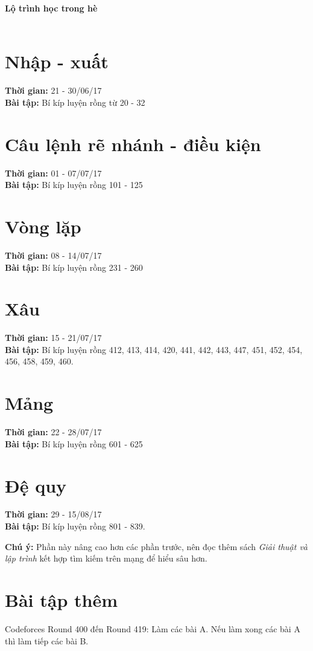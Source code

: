 \documentclass[oneside,12pt]{book}
\begin{document}
\frontmatter



\tableofcontents
\clearpage
\ifodd\value{page}\else
\thispagestyle{empty}
\fi
%
\mainmatter
%

{\noindent\LARGE\normalfont\bfseries Lộ trình học trong hè\\ \\ }




\section{Nhập - xuất}
\textbf{Thời gian: }21 - 30/06/17\\
\textbf{Bài tập: }Bí kíp luyện rồng từ 20 - 32

\section{Câu lệnh rẽ nhánh - điều kiện}
\textbf{Thời gian: } 01 - 07/07/17\\
\textbf{Bài tập: } Bí kíp luyện rồng 101 - 125

\section{Vòng lặp}
\textbf{Thời gian: } 08 - 14/07/17\\
\textbf{Bài tập: } Bí kíp luyện rồng 231 - 260

\section{Xâu}
\textbf{Thời gian: } 15 - 21/07/17\\
\textbf{Bài tập: } Bí kíp luyện rồng 412, 413, 414, 420, 441, 442, 443, 447, 451, 452, 454, 456, 458, 459, 460.

\section{Mảng}
\textbf{Thời gian: } 22 - 28/07/17\\
\textbf{Bài tập: } Bí kíp luyện rồng 601 - 625

\section{Đệ quy}
\textbf{Thời gian: } 29 - 15/08/17\\
\textbf{Bài tập: } Bí kíp luyện rồng 801 - 839.

\textbf{Chú ý: } Phần này nâng cao hơn các phần trước, nên đọc thêm sách \textit{Giải thuật và lập trình} kết hợp tìm kiếm trên mạng để hiểu sâu hơn.

\section{Bài tập thêm}
Codeforces Round 400 đến Round 419: Làm các bài A.
Nếu làm xong các bài A thì làm tiếp các bài B.
\end{document}
